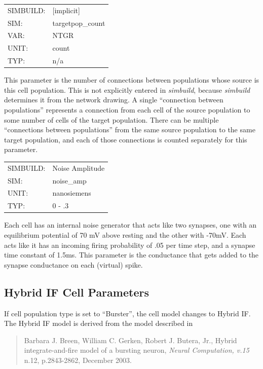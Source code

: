 \documentclass[12pt,openany,oneside]{book}
\newcommand{\ticite}[1]{\textit{#1}}
\newcommand{\prog}[1]{\textit{{#1}}}
\newcommand{\inquotes}[1]{{{``#1''}}}
\begin{document}
\begin{flushleft}
\begin{tabular}{@{}ll@{}}
SIMBUILD: & [implicit]\\
SIM: & targetpop\_count\\
VAR: & NTGR\\
UNIT: & count\\
TYP: & n/a\\
\end{tabular}
\end{flushleft}
\noindent
This parameter is the number of connections between populations whose
source is this cell population. This is not explicitly entered in
\prog{simbuild}, because \prog{simbuild} determines it from the network drawing. A
single \inquotes{connection between populations} represents a connection from
each cell of the source population to some number of cells of the
target population. There can be multiple \inquotes{connections between
populations} from the same source population to the same target
population, and each of those connections is counted separately for
this parameter.
\filbreak
\vspace{\baselineskip}

\begin{flushleft}
\begin{tabular}{@{}ll@{}}
SIMBUILD: & Noise Amplitude\\
SIM: & noise\_amp\\
UNIT: & nanosiemens\\
TYP: & 0 - .3\\
\end{tabular}
\end{flushleft}
\noindent
Each cell has an internal noise generator that acts like two synapses,
one with an equilibrium potential of 70 mV above resting and the other
with -70mV. Each acts like it has an incoming firing probability of
.05 per time step, and a synapse time constant of 1.5ms. This
parameter is the conductance that gets added to the synapse
conductance on each (virtual) spike.
\filbreak
\vspace{\baselineskip}

\subsection{Hybrid IF Cell Parameters}
\label{Hybrid Integrate and Fire (IF) Parameters}
If cell population type is set to \inquotes{Burster},
the cell model changes to Hybrid IF. The
Hybrid IF model is derived from the model described in
\begin{quote}
\label{Breen et al} Barbara J. Breen, William C. Gerken, Robert
J. Butera, Jr., Hybrid integrate-and-fire model of a bursting neuron,
\ticite{Neural Computation, v.15} n.12, p.2843-2862, December 2003.
\end{quote}
\end{document}
